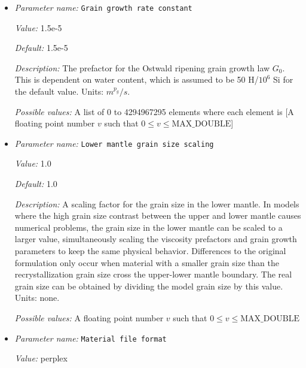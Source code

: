 \begin{itemize}
{\it Possible values:} A list of 0 to 4294967295 elements where each element is [A floating point number $v$ such that $0 \leq v \leq \text{MAX\_DOUBLE}$]
\item {\it Parameter name:} {\tt Grain growth rate constant}
\label{parameters:Material model/Grain size model/Grain growth rate constant}


{\it Value:} 1.5e-5


{\it Default:} 1.5e-5


{\it Description:} The prefactor for the Ostwald ripening grain growth law $G_0$. This is dependent on water content, which is assumed to be 50 H/$10^6$ Si for the default value. Units: $m^{p_g}/s$.


{\it Possible values:} A list of 0 to 4294967295 elements where each element is [A floating point number $v$ such that $0 \leq v \leq \text{MAX\_DOUBLE}$]
\item {\it Parameter name:} {\tt Lower mantle grain size scaling}
\label{parameters:Material model/Grain size model/Lower mantle grain size scaling}


{\it Value:} 1.0


{\it Default:} 1.0


{\it Description:} A scaling factor for the grain size in the lower mantle. In models where the high grain size contrast between the upper and lower mantle causes numerical problems, the grain size in the lower mantle can be scaled to a larger value, simultaneously scaling the viscosity prefactors and grain growth parameters to keep the same physical behavior. Differences to the original formulation only occur when material with a smaller grain size than the recrystallization grain size cross the upper-lower mantle boundary. The real grain size can be obtained by dividing the model grain size by this value. Units: none.


{\it Possible values:} A floating point number $v$ such that $0 \leq v \leq \text{MAX\_DOUBLE}$
\item {\it Parameter name:} {\tt Material file format}
\label{parameters:Material model/Grain size model/Material file format}


{\it Value:} perplex



\end{itemize}
